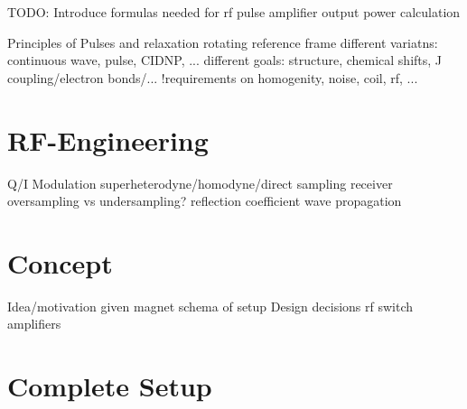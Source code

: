 TODO: Introduce formulas needed for rf pulse amplifier output power calculation

Principles of Pulses and relaxation
rotating reference frame
different variatns: continuous wave, pulse, CIDNP, ...
different goals: structure, chemical shifts, J coupling/electron bonds/...
!requirements on homogenity, noise, coil, rf, ...





\section{RF-Engineering}
Q/I Modulation
superheterodyne/homodyne/direct sampling receiver
oversampling vs undersampling?
reflection coefficient
wave propagation


\section{Concept}
Idea/motivation
given magnet
schema of setup
Design decisions
rf switch
amplifiers

\section{Complete Setup}

